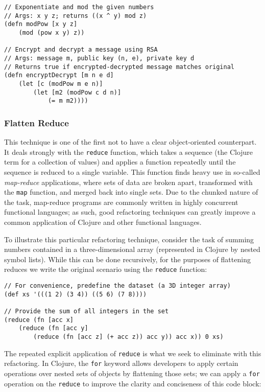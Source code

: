 \begin{verbatim}
// Exponentiate and mod the given numbers
// Args: x y z; returns ((x ^ y) mod z)
(defn modPow [x y z]
    (mod (pow x y) z))

// Encrypt and decrypt a message using RSA
// Args: message m, public key (n, e), private key d
// Returns true if encrypted-decrypted message matches original
(defn encryptDecrypt [m n e d]
    (let [c (modPow m e n)]
        (let [m2 (modPow c d n)]
            (= m m2))))
\end{verbatim}

\subsubsection{Flatten Reduce}

This technique is one of the first not to have a clear object-oriented counterpart. It deals strongly with the \verb!reduce! function, which takes a sequence (the Clojure term for a collection of values) and applies a function repeatedly until the sequence is reduced to a single variable. This function finds heavy use in so-called \textit{map-reduce} applications, where sets of data are broken apart, transformed with the \verb!map! function, and merged back into single sets. Due to the chunked nature of the task, map-reduce programs are commonly written in highly concurrent functional languages; as such, good refactoring techniques can greatly improve a common application of Clojure and other functional languages.

To illustrate this particular refactoring technique, consider the task of summing numbers contained in a three-dimensional array (represented in Clojure by nested symbol lists). While this can be done recursively, for the purposes of flattening reduces we write the original scenario using the \verb!reduce! function:

\begin{verbatim}
// For convenience, predefine the dataset (a 3D integer array)
(def xs '(((1 2) (3 4)) ((5 6) (7 8))))

// Provide the sum of all integers in the set
(reduce (fn [acc x]
    (reduce (fn [acc y]
        (reduce (fn [acc z] (+ acc z)) acc y)) acc x)) 0 xs)
\end{verbatim}

The repeated explicit application of \verb!reduce! is what we seek to eliminate with this refactoring. In Clojure, the \verb!for! keyword allows developers to apply certain operations over nested sets of objects by flattening those sets; we can apply a \verb!for! operation on the \verb!reduce! to improve the clarity and conciseness of this code block:

